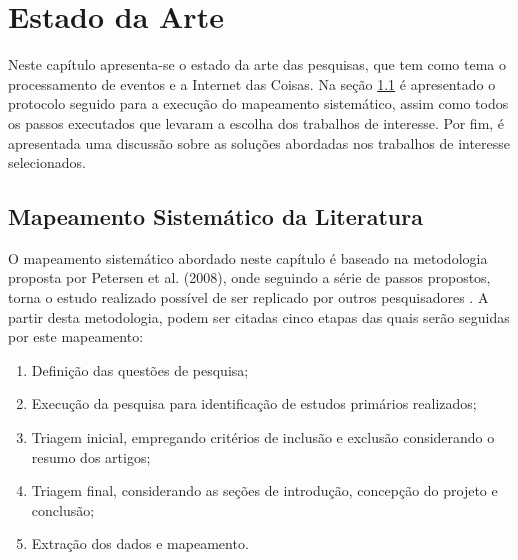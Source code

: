 \documentclass[ti,table]{texufpel} %
\begin{document}
  

  

  


  

\chapter{Estado da Arte}  

\label{cap:Estado_da_Arte} 

  

Neste capítulo apresenta-se o estado da arte das pesquisas, que tem como tema o processamento de eventos e a Internet das Coisas. Na seção \ref{sec:Mapeamento_Sistematico_da_Literatura} é apresentado o protocolo seguido para a execução do mapeamento sistemático, assim como todos os passos executados que levaram a escolha dos trabalhos de interesse. Por fim, é apresentada uma discussão sobre as soluções abordadas nos trabalhos de interesse selecionados.     

  

\section{Mapeamento Sistemático da Literatura} 
\label{sec:Mapeamento_Sistematico_da_Literatura} 

  

O mapeamento sistemático abordado neste capítulo é baseado na metodologia proposta por Petersen et al. (2008), onde seguindo a série de passos propostos, torna o estudo realizado possível de ser replicado por outros pesquisadores \cite{petersen08}. A partir desta metodologia, podem ser citadas cinco etapas das quais serão seguidas por este mapeamento: 

  

\begin{enumerate} 

    \item Definição das questões de pesquisa; 

    \item Execução da pesquisa para identificação de estudos primários realizados; 

    \item Triagem inicial, empregando critérios de inclusão e exclusão considerando o resumo dos artigos; 

    \item Triagem final, considerando as seções de introdução, concepção do projeto e conclusão; 

    \item Extração dos dados e mapeamento. 

     

  

\end{enumerate}   
\end{document}
